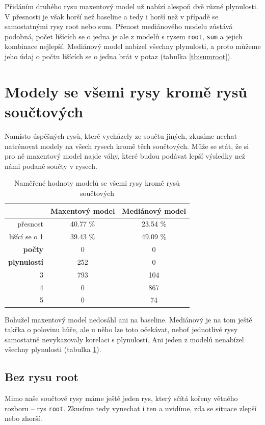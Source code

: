 \documentclass[12pt,a4paper]{report}
\begin{document}
Přidáním druhého rysu maxentový model už nabízí alespoň dvě různé plynulosti. V přesnosti je však horší než baseline a tedy i horší než v případě se samostatnými rysy root nebo sum. Přenost mediánového modelu zůstává podobná, počet lišících se o jedna je ale z modelů s rysem \texttt{root}, \texttt{sum} a jejich kombinace nejlepší. Mediánový model nabízel všechny plynulosti, a proto můžeme jeho údaj o počtu lišících se o jedna brát v potaz (tabulka \ref{tb:sumroot}).

\section{Modely se všemi rysy kromě rysů součtových}
Namísto úspěšných rysů, které vycházely ze součtu jiných, zkusíme nechat natrénovat modely na všech rysech kromě těch součtových. Může se stát, že si pro ně maxentový model najde váhy, které budou podávat lepší výsledky než námi podané součty v rysech.

\begin{table}[!htbp]
\begin{center}
\begin{tabular}{|r|c|c|}
\hline
 & \textbf{Maxentový model} & \textbf{Mediánový model} \\
 \hline
     přesnost & 40.77 \%  & 23.54 \%  \\
\hline
lišící se o 1 & 39.43 \% & 49.09 \%  \\
\hline
     \textbf{počty} \quad 1 & \color{red}0   & \color{red}0   \\
\textbf{plynulostí} \quad 2 & 252 & \color{red}0   \\
                          3 & 793 & 104 \\
                          4 & \color{red}0   & 867 \\
                          5 & \color{red}0   & 74  \\
\hline
\end{tabular}
\caption{Naměřené hodnoty modelů se všemi rysy kromě rysů součtových}\label{tb:woutsums}
\end{center}
\end{table}

Bohužel maxentový model nedosáhl ani na baseline. Mediánový je na tom ještě takřka o polovinu hůře, ale u něho lze toto očekávat, neboť jednotlivé rysy samostatně nevykazovaly korelaci s plynulostí. Ani jeden z modelů nenabízel všechny plynulosti (tabulka \ref{tb:woutsums}).

\subsection{Bez rysu root}
Mimo naše součtové rysy máme ještě jeden rys, který sčítá kořeny větného rozboru -- rys \texttt{root}. Zkusíme tedy vynechat i ten a uvidíme, zda se situace zlepší nebo zhorší.
\end{document}
